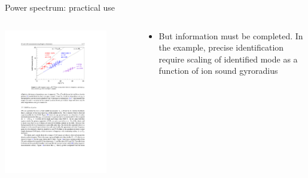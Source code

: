 \documentclass[t,10pt]{beamer}
\begin{document}
\begin{frame}{Power spectrum: practical use}
\begin{columns}[b]
\begin{column}{0.5\textwidth}
\includegraphics[width=0.8\textwidth]{gam-scaling}
\end{column}
\begin{column}{0.5\textwidth}
{\small \begin{itemize}
\item But information must be completed. In the example, precise
  identification require scaling of identified mode as a function of
  ion sound gyroradius
\end{itemize}}
\end{column}
\end{columns}
\end{frame}
\end{document}

